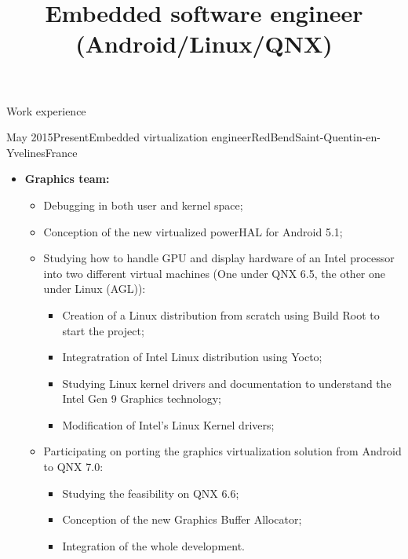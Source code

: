 \documentclass[a4paper, 10pt]{article}
\begin{document}




\begin {identity}
    \name {\personalFirstName}{\personalLastName}
\end {identity}

\title {Embedded software engineer (Android/Linux/QNX)}

\begin{section} {Work experience}
    \begin{experience}{May 2015}{Present}{Embedded virtualization engineer}{RedBend}{Saint-Quentin-en-Yvelines}{France}
	\begin{subexperience}
	    \begin{itemize}[parsep=0cm,itemsep=0cm,topsep=0cm]
		\item \textbf {Graphics team:}
		\begin{itemize}[parsep=0cm,itemsep=0cm,topsep=0cm]
		    \item Debugging in both user and kernel space;
		    \item Conception of the new virtualized powerHAL for Android 5.1;
		    \item Studying how to handle GPU and display hardware of an Intel processor into two different virtual machines (One under QNX 6.5, the other one under Linux (AGL)):
		    \begin{itemize}[parsep=0cm,itemsep=0cm,topsep=0cm]
			\item Creation of a Linux distribution from scratch using Build Root to start the project;
			\item Integratration of Intel Linux distribution using Yocto;
			\item Studying Linux kernel drivers and documentation to understand the Intel Gen 9 Graphics technology;
			\item Modification of Intel's Linux Kernel drivers;
		    \end{itemize}
		    \item Participating on porting the graphics virtualization solution from Android to QNX 7.0:
		    \begin{itemize}[parsep=0cm,itemsep=0cm,topsep=0cm]
			\item Studying the feasibility on QNX 6.6;
			\item Conception of the new Graphics Buffer Allocator;
			\item Integration of the whole development.
		    \end{itemize}
		\end{itemize}
	    \end{itemize}
	\end{subexperience}
    \end{experience}


\end{section}
\end{document}
